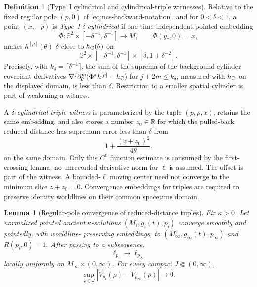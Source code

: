 \documentclass[10pt]{coll-l}
\newcommand{\R}{\mathbb{R}}
\newcommand{\Sph}{\mathbb{S}}
\newtheorem{lemma}[theorem]{Lemma}
\theoremstyle{definition}
\newtheorem{definition}[theorem]{Definition}
\theoremstyle{remark}
\numberwithin{section}{chapter}
\numberwithin{equation}{chapter}
\begin{document}
\begin{definition}[Type~I cylindrical and cylindrical-triple witnesses]
\label{def:ncs-TypeI-cylinder-witness}
Relative to the fixed regular pole $(p,0)$ of
\eqref{eq:ncs-backward-notation}, and for $0<\delta<1$, a point
$(x,-\rho)$ is
\emph{Type~I $\delta$-cylindrical} if one time-independent pointed embedding
\begin{equation}
 \Phi:\Sph^2\times[-\delta^{-1},\delta^{-1}]\longrightarrow M,
 \qquad \Phi(y_*,0)=x,                                \label{eq:ncs-TypeI-embedding}
\end{equation}
makes $h^{[\rho]}(\theta)$ $\delta$-close to
$h_{\rm C}(\theta)$ on
\begin{equation}
 \Sph^2\times[-\delta^{-1},\delta^{-1}]
       \times[\delta,1+\delta^{-2}].                  \label{eq:ncs-TypeI-fixed-window}
\end{equation}
Precisely, with $k_\delta=\lceil\delta^{-1}\rceil$, the sum of the suprema
of the background-cylinder covariant derivatives
$\nabla^j\partial_\theta^m(\Phi^*h^{[\rho]}-h_{\rm C})$ for
$j+2m\leq k_\delta$, measured with $h_{\rm C}$ on the displayed domain,
is less than $\delta$.  Restriction to a smaller spatial cylinder is part
of weakening a witness.

A \emph{$\delta$-cylindrical triple witness} is parameterized by the tuple
$(p,\rho,x)$, retains the same embedding, and also stores a number
$z_0\in\R$ for which the pulled-back reduced distance has
supremum error less than $\delta$ from
\begin{equation}
              1+\frac{(z+z_0)^2}{4\theta}.             \label{eq:ncs-cylinder-offset-potential}
\end{equation}
on the same domain.  Only this $C^0$ function estimate is consumed by the
first-crossing lemma; no unrecorded derivative norm for $\ell$ is assumed.
The offset is part of the witness.  A bounded-$\ell$ moving center need not
converge to the minimum slice $z+z_0=0$.  Convergence embeddings for triples
are required to preserve identity worldlines on their common spacetime
domain.
\end{definition}

\begin{lemma}[Regular-pole convergence of reduced-distance tuples]
\label{lem:ncs-regular-pole-tuple-compactness}
Fix $\kappa>0$.  Let normalized pointed ancient $\kappa$-solutions
$(M_i,g_i(t),p_i)$ converge smoothly and pointedly, with worldline-
preserving embeddings, to $(M_\infty,g_\infty(t),p_\infty)$ and
$R(p_i,0)=1$.  After passing to a subsequence,
\begin{equation}
          \ell_{p_i}\longrightarrow\ell_{p_\infty}    \label{eq:ncs-regular-pole-ell-convergence}
\end{equation}
locally uniformly on $M_\infty\times(0,\infty)$.  For every compact
$J\Subset(0,\infty)$,
\begin{equation}
 \sup_{\rho\in J}
   \left|\widetilde V_{p_i}(\rho)
               -\widetilde V_{p_\infty}(\rho)\right|\longrightarrow0.  \label{eq:ncs-regular-pole-mass-convergence}
\end{equation}
\end{lemma}
\end{document}
